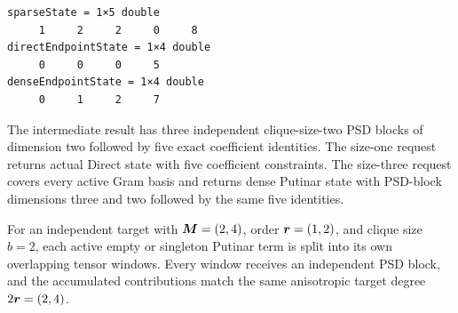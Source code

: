 \begin{lstlisting}[style=dpoutput]
sparseState = 1×5 double
     1     2     2     0     8
directEndpointState = 1×4 double
     0     0     0     5
denseEndpointState = 1×4 double
     0     1     2     7
\end{lstlisting}

The intermediate result has three independent clique-size-two PSD blocks of dimension two followed by five exact coefficient identities. The size-one request returns actual Direct state with five coefficient constraints. The size-three request covers every active Gram basis and returns dense Putinar state with PSD-block dimensions three and two followed by the same five identities.

 For an independent target with $\boldsymbol{M}=(2,4)$, order $\boldsymbol{r}=(1,2)$, and clique size $b=2$, each active empty or singleton Putinar term is split into its own overlapping tensor windows. Every window receives an independent PSD block, and the accumulated contributions match the same anisotropic target degree $2\boldsymbol{r}=(2,4)$.
\begin{center}
\end{center}

